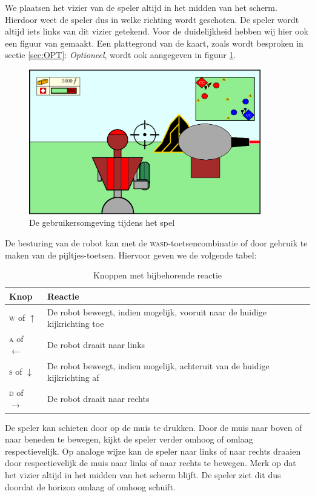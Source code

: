 We plaatsen het vizier van de speler altijd in het midden van het scherm. Hierdoor weet de speler dus in welke richting wordt geschoten. De speler wordt altijd iets links van dit vizier getekend. Voor de duidelijkheid hebben wij hier ook een figuur van gemaakt. Een plattegrond van de kaart, zoals wordt besproken in sectie \ref{sec:OPT}: \emph{Optioneel}, wordt ook aangegeven in figuur \ref{fig:UI}.
\begin{figure}[H]
\includegraphics[width=0.9\textwidth]{Graphics/UI.eps}
\caption{De gebruikersomgeving tijdens het spel}
\label{fig:UI}
\end{figure}
De besturing van de robot kan met de \textsc{wasd}-toetsencombinatie of door gebruik te maken van de pijltjes-toetsen. Hiervoor geven we de volgende tabel:
\begin{table}[H]
        \small
        \centering
        \begin{tabular}{| l | l |}
        \hline
        Knop & Reactie \\ \hline
        \textsc{w} of $\uparrow$ & De robot beweegt, indien mogelijk, vooruit naar de huidige kijkrichting toe \\ \hline
        \textsc{a} of $\leftarrow$ & De robot draait naar links \\ \hline
        \textsc{s} of $\downarrow$ & De robot beweegt, indien mogelijk, achteruit van de huidige kijkrichting af \\ \hline
        \textsc{d} of $\rightarrow$ & De robot draait naar rechts \\ \hline
        \end{tabular}
        \caption{Knoppen met bijbehorende reactie}
        \label{tab:planning}
    \end{table}

De speler kan schieten door op de muis te drukken. Door de muis naar boven of naar beneden te bewegen, kijkt de speler verder omhoog of omlaag respectievelijk. Op analoge wijze kan de speler naar links of naar rechts draaien door respectievelijk de muis naar links of naar rechts te bewegen. Merk op dat het vizier altijd in het midden van het scherm blijft. De speler ziet dit dus doordat de horizon omlaag of omhoog schuift.
\FloatBarrier
